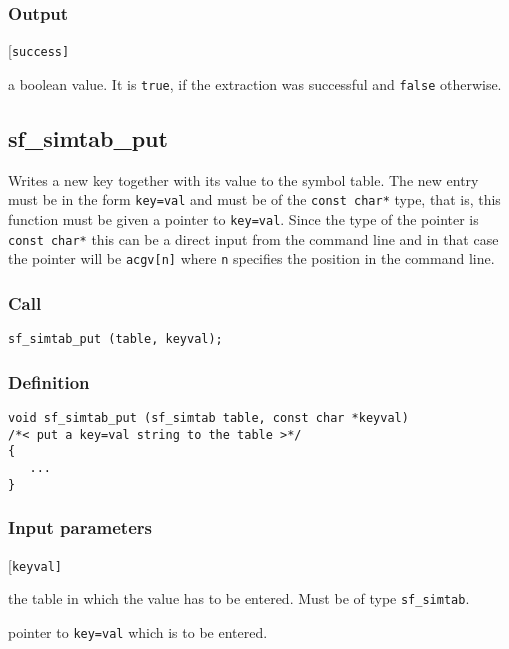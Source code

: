 \subsubsection*{Output}
\begin{desclist}{\tt }{\quad}[\tt success]
   \setlength\itemsep{0pt}
   \item[success] a boolean value. It is \texttt{true}, if the extraction was successful and \texttt{false} otherwise.
\end{desclist}




\subsection{{sf\_simtab\_put}}\label{sec:sf_simtab_put}
Writes a new key together with its value to the symbol table. The new entry must be in the form \texttt{key=val} and must be of the \texttt{const char*} type, that is, this function must be given a pointer to \texttt{key=val}. Since the type of the pointer is \texttt{const char*} this can be a direct input from the command line and in that case the pointer will be \texttt{acgv[n]} where \texttt{n} specifies the position in the command line.  

\subsubsection*{Call}
\begin{verbatim}sf_simtab_put (table, keyval);\end{verbatim}

\subsubsection*{Definition}
\begin{verbatim}
void sf_simtab_put (sf_simtab table, const char *keyval) 
/*< put a key=val string to the table >*/
{
   ...
}
\end{verbatim}

\subsubsection*{Input parameters}
\begin{desclist}{\tt }{\quad}[\tt keyval]
   \setlength\itemsep{0pt}
   \item[table] the table in which the value has to be entered. Must be of type \texttt{sf\_simtab}. 
   \item[keyval] pointer to \texttt{key=val} which is to be entered.
\end{desclist}




